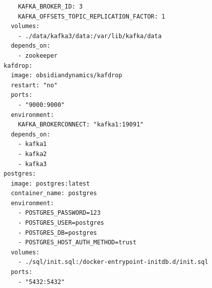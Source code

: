 \documentclass[11pt]{article}
\begin{document}
\begin{appendices}
\begin{adjustwidth}{-120pt}{100pt}
\begin{scriptsize}
\begin{verbatim}
      KAFKA_BROKER_ID: 3
      KAFKA_OFFSETS_TOPIC_REPLICATION_FACTOR: 1
    volumes:
      - ./data/kafka3/data:/var/lib/kafka/data
    depends_on:
      - zookeeper
  kafdrop:
    image: obsidiandynamics/kafdrop
    restart: "no"
    ports:
      - "9000:9000"
    environment:
      KAFKA_BROKERCONNECT: "kafka1:19091"
    depends_on:
      - kafka1
      - kafka2
      - kafka3
  postgres:
    image: postgres:latest
    container_name: postgres
    environment:
      - POSTGRES_PASSWORD=123
      - POSTGRES_USER=postgres
      - POSTGRES_DB=postgres
      - POSTGRES_HOST_AUTH_METHOD=trust
    volumes:
      - ./sql/init.sql:/docker-entrypoint-initdb.d/init.sql
    ports:
      - "5432:5432"
   
\end{verbatim}
\end{scriptsize}

\end{adjustwidth}

\end{appendices}
\end{document}
